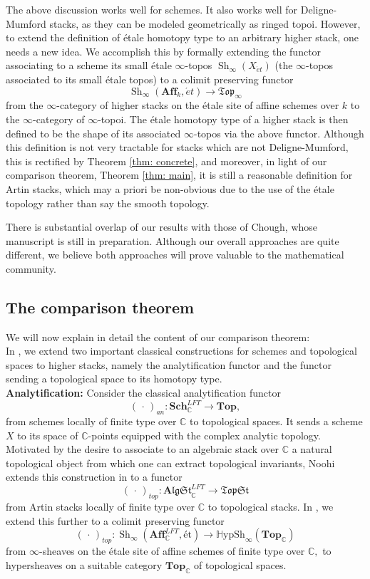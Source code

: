 \documentclass[12pt]{amsart}
\theoremstyle{definition}
\newcommand{\bC}{\mathbb{C}}
\newcommand{\Aff}{\mathbf{Aff}^{\mathit{LFT}}_{\mathbb{C}}}
\newcommand{\TopC}{\Top_\mathbb{C}}
\newcommand{\Sh}{\operatorname{Sh}}
\newcommand{\et}{\acute{e}t}
\def\Top{\mathbf{Top}}
\def\Sch{\mathbf{Sch}}
\renewcommand{\i}{\infty}
\def\Shi{\Sh_\i}
\def\Hshi{\mathbb{H}\mathrm{ypSh}_\i}
\def\blank{\mspace{3mu}\cdot\mspace{3mu}}
\def\Top{\mathbf{Top}}
\begin{document}
The above discussion works well for schemes. It also works well for Deligne-Mumford stacks, as they can be modeled geometrically as ringed topoi. However, to extend the definition of \'etale homotopy type to an arbitrary higher stack, one needs a new idea. We accomplish this by formally extending the functor associating to a scheme its small \'etale $\i$-topos $\Shi\left(X_{\et}\right)$ (the $\i$-topos associated to its small \'etale topos) to a colimit preserving functor $$\Shi\left(\mathbf{Aff}_k,\et\right) \to \mathfrak{Top}_\i$$ from the $\i$-category of higher stacks on the \'etale site of affine schemes over $k$ to the $\i$-category of $\i$-topoi. The \'etale homotopy type of a higher stack is then defined to be the shape of its associated $\i$-topos via the above functor. Although this definition is not very tractable for stacks which are not Deligne-Mumford, this is rectified by Theorem \ref{thm: concrete}, and moreover, in light of our comparison theorem, Theorem \ref{thm: main}, it is still a reasonable definition for Artin stacks, which may a priori be non-obvious due to the use of the \'etale topology rather than say the smooth topology.

There is substantial overlap of our results with those of Chough, whose manuscript \cite{chough} is still in preparation. Although our overall approaches are quite different, we believe both approaches will prove valuable to the mathematical community.

\subsection{The comparison theorem}
We will now explain in detail the content of our comparison theorem:\\

In \cite{knhom}, we extend two important classical constructions for schemes and topological spaces to higher stacks, namely the analytification functor and the functor sending a topological space to its homotopy type.\\

\textbf{Analytification:}
Consider the classical analytification functor
$$\left(\blank\right)_{an}:\Sch^{LFT}_\bC \to \Top,$$
from schemes locally of finite type over $\bC$ to topological spaces. It sends a scheme $X$ to its space of $\bC$-points equipped with the complex analytic topology. Motivated by the desire to associate to an algebraic stack over $\bC$ a natural topological object from which one can extract topological invariants, Noohi extends this construction in \cite{No1} to a functor
$$\left(\blank\right)_{top}:\mathbf{A}\!\mathfrak{lgSt}^{LFT}_{\mathbb{C}} \to \mathfrak{TopSt}$$ from Artin stacks locally of finite type over $\mathbb{C}$ to topological stacks. In \cite{knhom}, we extend this further to a colimit preserving functor
$$\left(\blank\right)_{top}:\Shi\left(\Aff,\mbox{\'et}\right) \to \Hshi\left(\TopC\right)$$
from $\i$-sheaves on the \'etale site of affine schemes of finite type over $\bC,$ to hypersheaves on a suitable category $\TopC$ of topological spaces.\\
\end{document}
